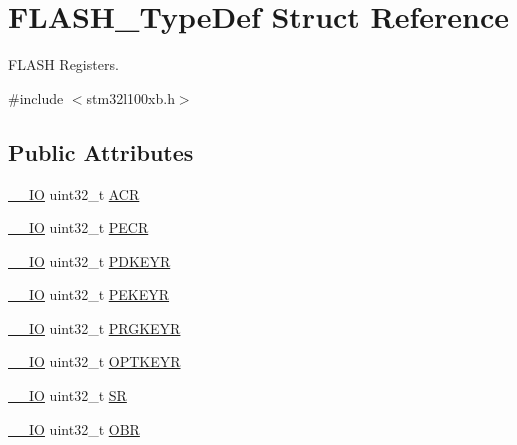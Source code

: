 \hypertarget{struct_f_l_a_s_h___type_def}{\section{F\-L\-A\-S\-H\-\_\-\-Type\-Def Struct Reference}
\label{struct_f_l_a_s_h___type_def}
}


F\-L\-A\-S\-H Registers.  




{\ttfamily \#include $<$stm32l100xb.\-h$>$}

\subsection*{Public Attributes}
\begin{DoxyCompactItemize}
\item 
\hyperlink{core__sc300_8h_aec43007d9998a0a0e01faede4133d6be}{\-\_\-\-\_\-\-I\-O} uint32\-\_\-t \hyperlink{struct_f_l_a_s_h___type_def_aaf432a8a8948613f4f66fcace5d2e5fe}{A\-C\-R}
\item 
\hyperlink{core__sc300_8h_aec43007d9998a0a0e01faede4133d6be}{\-\_\-\-\_\-\-I\-O} uint32\-\_\-t \hyperlink{struct_f_l_a_s_h___type_def_a58afa3377dd5f4ffa93eb3da4c653cba}{P\-E\-C\-R}
\item 
\hyperlink{core__sc300_8h_aec43007d9998a0a0e01faede4133d6be}{\-\_\-\-\_\-\-I\-O} uint32\-\_\-t \hyperlink{struct_f_l_a_s_h___type_def_a17d6fcde53db4cb932b3fbfe08235b31}{P\-D\-K\-E\-Y\-R}
\item 
\hyperlink{core__sc300_8h_aec43007d9998a0a0e01faede4133d6be}{\-\_\-\-\_\-\-I\-O} uint32\-\_\-t \hyperlink{struct_f_l_a_s_h___type_def_a3c470f54858e246365f56e5fe4d2a618}{P\-E\-K\-E\-Y\-R}
\item 
\hyperlink{core__sc300_8h_aec43007d9998a0a0e01faede4133d6be}{\-\_\-\-\_\-\-I\-O} uint32\-\_\-t \hyperlink{struct_f_l_a_s_h___type_def_a98a43d6cc0dfca44214d5e78115e8c51}{P\-R\-G\-K\-E\-Y\-R}
\item 
\hyperlink{core__sc300_8h_aec43007d9998a0a0e01faede4133d6be}{\-\_\-\-\_\-\-I\-O} uint32\-\_\-t \hyperlink{struct_f_l_a_s_h___type_def_a793cd13a4636c9785fdb99316f7fd7ab}{O\-P\-T\-K\-E\-Y\-R}
\item 
\hyperlink{core__sc300_8h_aec43007d9998a0a0e01faede4133d6be}{\-\_\-\-\_\-\-I\-O} uint32\-\_\-t \hyperlink{struct_f_l_a_s_h___type_def_a52c4943c64904227a559bf6f14ce4de6}{S\-R}
\item 
\hyperlink{core__sc300_8h_aec43007d9998a0a0e01faede4133d6be}{\-\_\-\-\_\-\-I\-O} uint32\-\_\-t \hyperlink{struct_f_l_a_s_h___type_def_a24dece1e3b3185456afe34c3dc6add2e}{O\-B\-R}

\end{DoxyCompactItemize}
